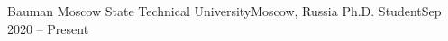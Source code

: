 
    \resumeSubheading
    {Bauman Moscow State Technical University}{Moscow, Russia}
    {Ph.D. Student}{Sep 2020 -- Present}
